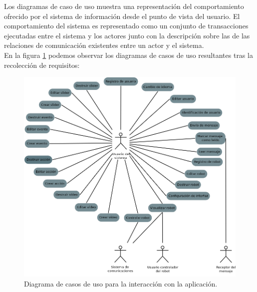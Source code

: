 Los diagramas de caso de uso muestra una representación del comportamiento ofrecido por el sistema de información desde el punto de vista del usuario. El comportamiento
del sistema es representado como un conjunto de transacciones ejecutadas entre el sistema y los actores junto con la descripción sobre las de las relaciones de comunicación
existentes entre un actor y el sistema.\\

En la figura \ref{diagram:caso-uso} podemos observar los diagramas de casos de uso resultantes tras la recolección de requisitos:

\begin{figure}[H]
  \begin{center}
    \includegraphics[scale=.5]{diagramas/casos-uso.png}
  \end{center}
  \caption{Diagrama de casos de uso para la interacción con la aplicación.}
  \label{diagram:caso-uso}
\end{figure}


